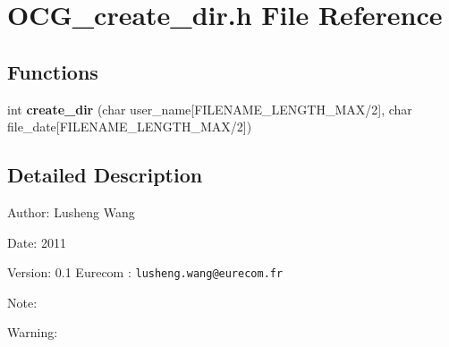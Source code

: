 \section{OCG\_\-create\_\-dir.h File Reference}
\label{OCG__create__dir_8h}
\subsection*{Functions}
\begin{CompactItemize}
\item 
int {\bf create\_\-dir} (char user\_\-name[FILENAME\_\-LENGTH\_\-MAX/2], char file\_\-date[FILENAME\_\-LENGTH\_\-MAX/2])
\end{CompactItemize}


\subsection{Detailed Description}
\begin{Desc}
\item[Author:]Lusheng Wang \end{Desc}
\begin{Desc}
\item[Date:]2011 \end{Desc}
\begin{Desc}
\item[Version:]0.1  Eurecom : {\tt lusheng.wang@eurecom.fr} \end{Desc}
\begin{Desc}
\item[Note:]\end{Desc}
\begin{Desc}
\item[Warning:]\end{Desc}
